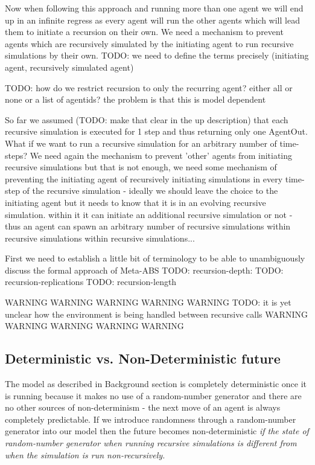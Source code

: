 Now when following this approach and running more than one agent we will end up in an infinite regress as every agent will run the other agents which will lead them to initiate a recursion on their own. We need a mechanism to prevent agents which are recursively simulated by the initiating agent to run recursive simulations by their own. TODO: we need to define the terms precisely (initiating agent, recursively simulated agent)

TODO:  how do we restrict recursion to only the recurring agent? either all or none or a list of agentids? the problem is that this is model dependent

So far we assumed (TODO: make that clear in the up description) that each recursive simulation is executed for 1 step and thus returning only one AgentOut. What if we want to run a recursive simulation for an arbitrary number of time-steps? We need again the mechanism to prevent 'other' agents from initiating recursive simulations but that is not enough, we need some mechanism of preventing the initiating agent of recursively initiating simulations in every time-step of the recursive simulation - ideally we should leave the choice to the initiating agent but it needs to know that it is in an evolving recursive simulation. within it it can initiate an additional recursive simulation or not - thus an agent can spawn an arbitrary number of recursive simulations within recursive simulations within recursive simulations...

First we need to establish a little bit of terminology to be able to unambiguously discuss the formal approach of Meta-ABS
TODO: recursion-depth:
TODO: recursion-replications
TODO: recursion-length

WARNING WARNING WARNING WARNING WARNING 
TODO: it is yet unclear how the environment is being handled between recursive calls
WARNING WARNING WARNING WARNING WARNING 

\subsection{Deterministic vs. Non-Deterministic future}
The model as described in Background section is completely deterministic once it is running because it makes no use of a random-number generator and there are no other sources of non-determinism - the next move of an agent is always completely predictable. If we introduce randomness through a random-number generator into our model then the future becomes non-deterministic \textit{if the state of random-number generator when running recursive simulations is different from when the simulation is run non-recursively.}

